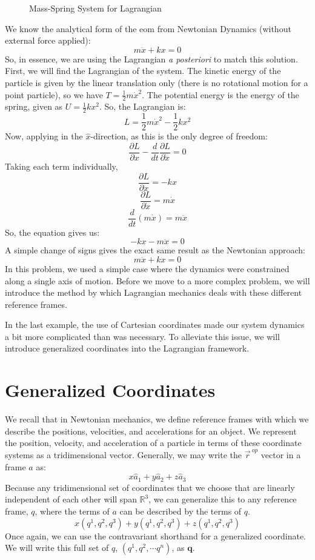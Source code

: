 \begin{example}
\begin{figure}[H]
\begin{tikzpicture}[x=0.75pt,y=0.75pt,yscale=-0.9,xscale=0.9]
\end{tikzpicture}

    \caption{Mass-Spring System for Lagrangian}
    \label{fig:mass spring lagrange}
\end{figure}

We know the analytical form of the \gls{eom} from Newtonian Dynamics (without external force applied):
$$m\ddot{x}+kx=0$$
So, in essence, we are using the \gls{Lagrangian} \textit{a posteriori} to match this solution. First, we will find the \gls{Lagrangian} of the system. The kinetic energy of the particle is given by the linear translation only (there is no rotational motion for a point particle), so we have $T=\frac{1}{2}m\dot{x}^2$. The potential energy is the energy of the spring, given as $U=\frac{1}{2}kx^2$. So, the \gls{Lagrangian} is:
$$L=\frac{1}{2}m\dot{x}^2-\frac{1}{2}kx^2$$
Now, applying  in the $\hat{x}$-direction, as this is the only degree of freedom:
$$\frac{\partial L}{\partial x}-\frac{d}{dt}\frac{\partial L}{\partial \dot{x}}=0$$
Taking each term individually,
$$\frac{\partial L}{\partial x}=-kx$$
$$\frac{\partial L}{\partial \dot{x}}=m\dot{x}$$
$$\frac{d}{dt}\left(m\dot{x}\right)=m\ddot{x}$$
So, the  equation gives us:
$$-kx-m\ddot{x}=0$$
A simple change of signs gives the exact same result as the Newtonian approach:
$$m\ddot{x}+kx=0$$
In this problem, we used a simple case where the dynamics were constrained along a single axis of motion. Before we move to a more complex problem, we will introduce the method by which \gls{Lagrangian} mechanics deals with these different reference frames.
\end{example}

In the last example, the use of Cartesian coordinates made our system dynamics a bit more complicated than was necessary. To alleviate this issue, we will introduce generalized coordinates into the \gls{Lagrangian} framework.

\section{Generalized Coordinates}

We recall that in Newtonian mechanics, we define reference frames with which we describe the positions, velocities, and accelerations for an object. We represent the position, velocity, and acceleration of a particle in terms of these coordinate systems as a tridimensional vector. Generally, we may write the $\vec{r}^{\ op}$  vector in a frame $a$ as:
$$x\hat{a}_1+y\hat{a}_2+z\hat{a}_3$$
Because any tridimensional set of coordinates that we choose that are linearly independent of each other will span $\mathbb{R}^3$, we can generalize this to any reference frame, $q$, where the terms of $a$ can be described by the terms of $q$.
$$x\left(q^1,q^2,q^3\right)+y\left(q^1,q^2,q^3\right)+z\left(q^1,q^2,q^3\right)$$
Once again, we can use the contravariant shorthand for a generalized coordinate. We will write this full set of $q$, $\left(q^1,q^2,\cdots q^n\right)$, as $\bm{q}$.

